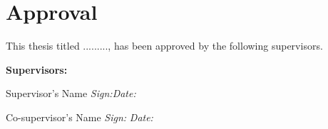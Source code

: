 \chapter*{Approval}

This thesis titled ........., has been approved by the following supervisors.


\begin{flushleft}
\vspace{1cm}
\textbf{Supervisors:}

Supervisor's Name \hfill \textit{Sign:}\underline{\hspace{4cm}}\textit{Date:}\underline{\hspace{4cm}} 

\vspace{1.0cm}
Co-supervisor's Name \hfill \textit{Sign:}\underline{\hspace{4cm}} \textit{Date:}\underline{\hspace{4cm}}   
\end{flushleft}






